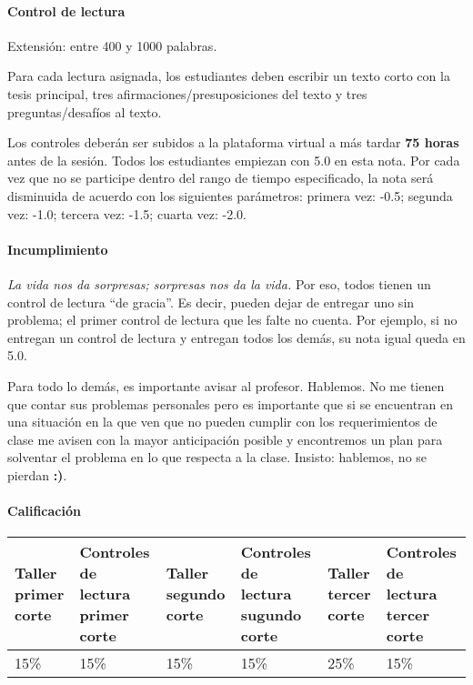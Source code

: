 \documentclass[spanish,]{article}
\let\oldparagraph\paragraph
\renewcommand{\paragraph}[1]{\oldparagraph{#1}\mbox{}}
\begin{document}
\paragraph{\texorpdfstring{\textbf{Control de
lectura}}{Control de lectura}}\label{control-de-lectura}

Extensión: entre 400 y 1000 palabras.

Para cada lectura asignada, los estudiantes deben escribir un texto
corto con la tesis principal, tres afirmaciones/presuposiciones del
texto y tres preguntas/desafíos al texto.

Los controles deberán ser subidos a la plataforma virtual a más tardar
\textbf{75 horas} antes de la sesión. Todos los estudiantes empiezan con
5.0 en esta nota. Por cada vez que no se participe dentro del rango de
tiempo especificado, la nota será disminuida de acuerdo con los
siguientes parámetros: primera vez: -0.5; segunda vez: -1.0; tercera
vez: -1.5; cuarta vez: -2.0.

\paragraph{\texorpdfstring{\textbf{Incumplimiento}}{Incumplimiento}}\label{incumplimiento}

\emph{La vida nos da sorpresas; sorpresas nos da la vida.} Por eso,
todos tienen un control de lectura ``de gracia''. Es decir, pueden dejar
de entregar uno sin problema; el primer control de lectura que les falte
no cuenta. Por ejemplo, si no entregan un control de lectura y entregan
todos los demás, su nota igual queda en 5.0.

Para todo lo demás, es importante avisar al profesor. Hablemos. No me
tienen que contar sus problemas personales pero es importante que si se
encuentran en una situación en la que ven que no pueden cumplir con los
requerimientos de clase me avisen con la mayor anticipación posible y
encontremos un plan para solventar el problema en lo que respecta a la
clase. Insisto: hablemos, no se pierdan \textbf{:)}.

\paragraph{\texorpdfstring{\textbf{Calificación}}{Calificación}}\label{calificaciuxf3n}

\begin{tabular}{l|l|l|l|l|l}
\hline
Taller primer corte & Controles de lectura primer corte & Taller segundo corte & Controles de lectura sugundo corte & Taller tercer corte & Controles de lectura tercer corte\\
\hline
15\% & 15\% & 15\% & 15\% & 25\% & 15\%\\
\hline
\end{tabular}
\end{document}
